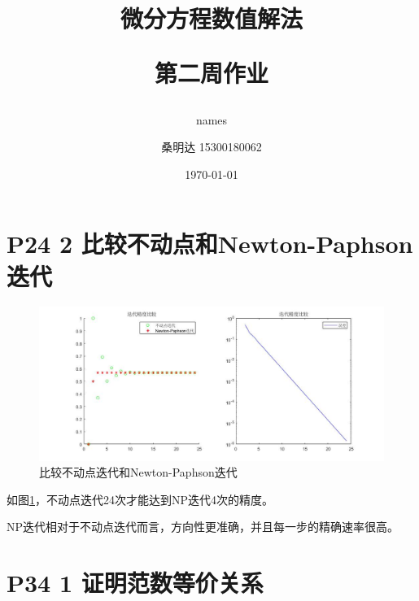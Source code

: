 \documentclass{article}%
\author{names}
\title{\heiti 微分方程数值解法\\ [2ex] \begin{large} 第二周作业 \end{large}}
\author{\kaishu 桑明达 15300180062}
\date{\today}
\begin{document}
\maketitle


\section{P24 2 比较不动点和Newton-Paphson迭代}

\begin{figure}[H]
	\begin{center}
		\includegraphics[width=1\linewidth]{week2.1.1.jpg}
		\caption{比较不动点迭代和Newton-Paphson迭代}
		\label{Fig:1}
	\end{center}
	\vspace{-0.5em}
\end{figure}

如图\ref{Fig:1}，不动点迭代24次才能达到NP迭代4次的精度。

NP迭代相对于不动点迭代而言，方向性更准确，并且每一步的精确速率很高。

\newpage
\section{P34 1 证明范数等价关系}
\end{document}
